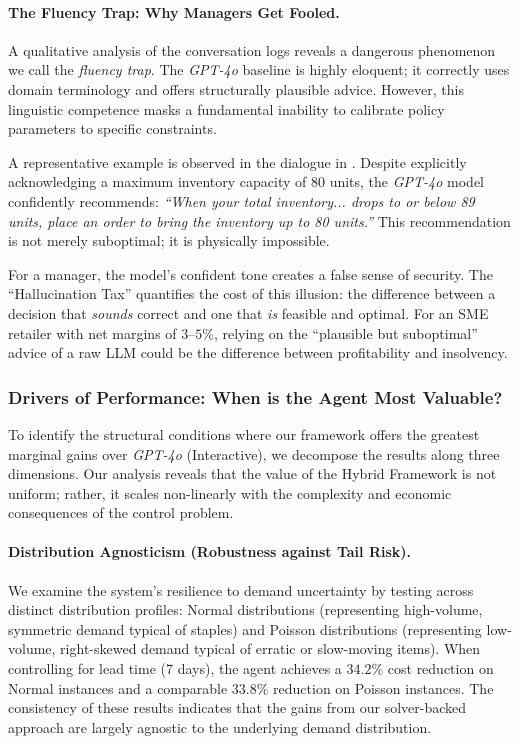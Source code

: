 \documentclass[mnsc,nonblindrev]{informs3_hide}
\begin{document}
\vspace{.5em}

\paragraph{The Fluency Trap: Why Managers Get Fooled.}
A qualitative analysis of the conversation logs reveals a dangerous phenomenon we call the \emph{fluency trap}. The \emph{GPT-4o} baseline is highly eloquent; it correctly uses domain terminology and offers structurally plausible advice. However, this linguistic competence masks a fundamental inability to calibrate policy parameters to specific constraints.

A representative example is observed in the dialogue in . Despite explicitly acknowledging a maximum inventory capacity of $80$ units, the \emph{GPT-4o} model confidently recommends: \emph{``When your total inventory... drops to or below 89 units, place an order to bring the inventory up to 80 units.''} 
This recommendation is not merely suboptimal; it is physically impossible. 

For a manager, the model's confident tone creates a false sense of security. The ``Hallucination Tax'' quantifies the cost of this illusion: the difference between a decision that \emph{sounds} correct and one that \emph{is} feasible and optimal. For an SME retailer with net margins of $3$--$5\%$, relying on the ``plausible but suboptimal'' advice of a raw LLM could be the difference between profitability and insolvency.






\subsubsection{Drivers of Performance: When is the Agent Most Valuable?}
\label{sec:driver}

To identify the structural conditions where our framework offers the greatest marginal gains over \emph{GPT-4o} (Interactive), we decompose the results along three dimensions. Our analysis reveals that the value of the Hybrid Framework is not uniform; rather, it scales non-linearly with the complexity and economic consequences of the control problem. \vspace{.5em}


\paragraph{Distribution Agnosticism (Robustness against Tail Risk).}
We examine the system's resilience to demand uncertainty by testing across distinct distribution profiles: Normal distributions (representing high-volume, symmetric demand typical of staples) and Poisson distributions (representing low-volume, right-skewed demand typical of erratic or slow-moving items). 
%
When controlling for lead time (7 days), the agent achieves a $34.2\%$ cost reduction on Normal instances and a comparable $33.8\%$ reduction on Poisson instances. The consistency of these results indicates that the gains from our solver-backed approach are largely agnostic to the underlying demand distribution. 
\end{document}
